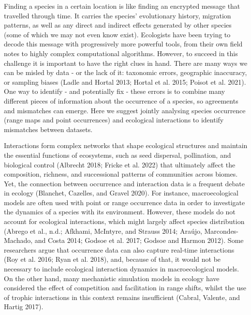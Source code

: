 \documentclass[10pt,oneside]{article}
\begin{document}
Finding a species in a certain location is like finding an encrypted
message that travelled through time. It carries the species'
evolutionary history, migration patterns, as well as any direct and
indirect effects generated by other species (some of which we may not
even know exist). Ecologists have been trying to decode this message
with progressively more powerful tools, from their own field notes to
highly complex computational algorithms. However, to succeed in this
challenge it is important to have the right clues in hand. There are
many ways we can be misled by data - or the lack of it: taxonomic
errors, geographic inaccuracy, or sampling biases (Ladle and Hortal
2013; Hortal et al. 2015; Poisot et al. 2021). One way to identify - and
potentially fix - these errors is to combine many different pieces of
information about the occurrence of a species, so agreements and
mismatches can emerge. Here we suggest jointly analysing species
occurrence (range maps and point occurrences) and ecological
interactions to identify mismatches between datasets.

Interactions form complex networks that shape ecological structures and
maintain the essential functions of ecosystems, such as seed dispersal,
pollination, and biological control (Albrecht 2018; Fricke et al. 2022)
that ultimately affect the composition, richness, and successional
patterns of communities across biomes. Yet, the connection between
occurrence and interaction data is a frequent debate in ecology
(Blanchet, Cazelles, and Gravel 2020). For instance, macroecological
models are often used with point or range occurrence data in order to
investigate the dynamics of a species with its environment. However,
these models do not account for ecological interactions, which might
largely affect species distribution (Abrego et al., n.d.; Afkhami,
McIntyre, and Strauss 2014; Araújo, Marcondes-Machado, and Costa 2014;
Godsoe et al. 2017; Godsoe and Harmon 2012). Some researchers argue that
occurrence data can also capture real-time interactions (Roy et al.
2016; Ryan et al. 2018), and, because of that, it would not be necessary
to include ecological interaction dynamics in macroecological models. On
the other hand, many mechanistic simulation models in ecology have
considered the effect of competition and facilitation in range shifts,
whilst the use of trophic interactions in this context remains
insufficient (Cabral, Valente, and Hartig 2017).
\end{document}
